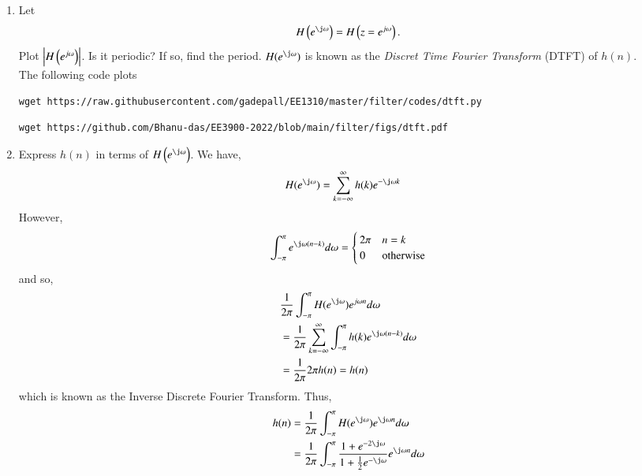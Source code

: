 \documentclass[journal,12pt,twocolumn]{IEEEtran}
\renewcommand\thesection{\arabic{section}}
\begin{document}
\begin{enumerate}[label=\thesection.\arabic*]
%
\item 
Let
\begin{equation}
H\brak{e^{\j \omega}} = H\brak{z = e^{j \omega}}.
\end{equation}
Plot $\left\vert H\left(e^{j \omega}\right)\right\vert$.  Is it periodic? If so, find the period. $H(e^{\j \omega})$ is
known as the {\em Discret Time Fourier Transform} (DTFT) of $h(n)$.
\\
\solution The following code plots 
\begin{lstlisting}
wget https://raw.githubusercontent.com/gadepall/EE1310/master/filter/codes/dtft.py
\end{lstlisting}
\begin{lstlisting}
wget https://github.com/Bhanu-das/EE3900-2022/blob/main/filter/figs/dtft.pdf
\end{lstlisting}
\item Express $h(n)$ in terms of $H\brak{e^{\j \omega}}$.
\solution We have,
\begin{align}
	H(e^{\j\omega}) &= \sum_{k = -\infty}^{\infty}h(k)e^{-\j\omega k}
\end{align}
However,
\begin{align}
	\int_{-\pi}^{\pi}e^{\j\omega(n - k)}d\omega =
	\begin{cases}
		2\pi & n = k \\
		0 & \textrm{otherwise}
	\end{cases}
\end{align}
and so,
\begin{align}
	&\frac{1}{2\pi}\int_{-\pi}^{\pi}H(e^{\j\omega})e^{j\omega n}d\omega \\
	&= \frac{1}{2\pi}\sum_{k = -\infty}^{\infty}\int_{-\pi}^{\pi}h(k)e^{\j\omega(n - k)}d\omega \\
	&= \frac{1}{2\pi}2\pi h(n) = h(n)
\end{align}
which is known as the Inverse Discrete Fourier Transform. Thus,
\begin{align}
	h(n) &= \frac{1}{2\pi}\int_{-\pi}^{\pi}H(e^{\j\omega})e^{\j\omega n}d\omega \\
		 &= \frac{1}{2\pi}\int_{-\pi}^{\pi}\frac{1 + e^{-2\j\omega}}{1 + \frac{1}{2}e^{-\j\omega}}e^{\j\omega n}d\omega
	\label{eq:idtft}
\end{align}

\end{enumerate}
\end{document}
